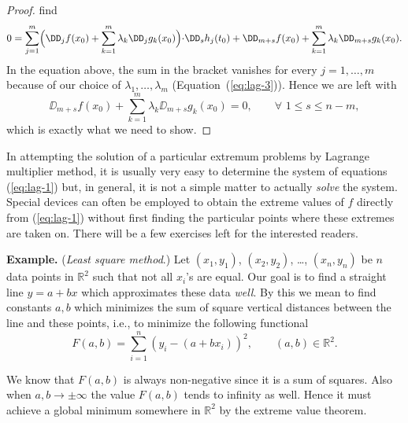 \documentclass[11pt]{article}
\begin{document}
\begin{proof}
find
\begin{equation*}
  0 = \sum_{j=1}^m \Bigl( \DD_j f(x_0) + \sum_{k=1}^m \lambda_k \DD_j
  g_k(x_0) \Bigl) \cdot \DD_s h_j(t_0) + \DD_{m+s} f(x_0) + \sum_{k=1}^m
  \lambda_k \DD_{m+s} g_k(x_0).
\end{equation*}
In the equation above, the sum in the bracket vanishes for every $j =
1, \dots, m$ because of our choice of $\lambda_1, \dots, \lambda_m$
(Equation~(\ref{eq:lag-3})).  Hence we are left with
\begin{equation*}
  \DD_{m+s} f(x_0) + \sum_{k=1}^m \lambda_k \DD_{m+s} g_k(x_0) = 0, \qquad
  \forall \,\, 1 \leq s \leq n - m,
\end{equation*}
which is exactly what we need to show.  
\end{proof}

In attempting the solution of a particular extremum problems by
Lagrange multiplier method, it is usually very easy to determine the system of
equations (\ref{eq:lag-1}) but, in general, it is not a simple matter
to actually {\em solve\/} the system.  Special devices can often be
employed to obtain the extreme values of $f$ directly from
(\ref{eq:lag-1}) without first finding the particular points where
these extremes are taken on.  There will be a few exercises left for
the interested readers.

\medskip

\noindent\textbf{Example.} (\textit{Least square method}.)
Let $(x_1, y_1)$, $(x_2, y_2)$, \dots, $(x_n, y_n)$ be $n$ data points in $\mathbb{R}^2$ such that not all $x_i$'s are equal.  Our goal is to find a straight line $y = a + bx$ which approximates these data \textit{well}.  By this we mean to find constants $a, b$ which minimizes the sum of square vertical distances between the line and these points, i.e., to minimize the following functional
\begin{equation}
  \label{eq:ls}
  F(a,b) = \sum_{i=1}^n \left( y_i - (a + b x_i) \right)^2, \qquad (a,b) \in \mathbb{R}^2.
\end{equation}

We know that $F(a,b)$ is always non-negative since it is a sum of squares.
Also when $a, b \to \pm \infty$ the value $F(a,b)$ tends to infinity as well.
Hence it must achieve a global minimum somewhere in $\mathbb{R}^2$ by the extreme value theorem.
\end{document}
